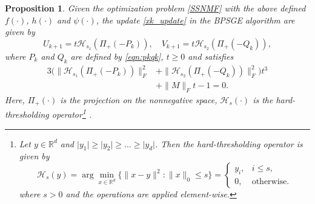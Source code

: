 \documentclass[letterpaper]{article} %
\newtheorem{proposition}{Proposition}
\begin{document}
	\begin{proposition}\label{Prop_SSNMF}
		Given the optimization problem \eqref{SSNMF} with the above defined $f(\cdot)$, $h(\cdot)$ and $\psi(\cdot)$, the update  \eqref{xk_update} in the BPSGE algorithm   are given by
		\[
		U_{k+1}=t\mathcal{H}_{s_{1}}(\Pi_{+}(-P_{k})), \quad V_{k+1}=t\mathcal{H}_{s_{2}}(\Pi_{+}(-Q_{k})),
		\]
		where $P_k$ and $Q_k$ are defined by \eqref{eqn:pkqk}, $t\ge 0$ and satisfies
		\[\begin{aligned}
			3(\|\mathcal{H}_{s_{1}}(\Pi_{+}(-P_{k}))\|_{F}^{2}&+\|\mathcal{H}_{s_{2}}(\Pi_{+}(-Q_{k}))\|_{F}^{2})t^{3} \\&+\|M\|_{F}t-1=0.
		\end{aligned}\]
		Here, $\Pi_{+}(\cdot)$ is the projection on the nonnegative space, $\mathcal{H}_{s}(\cdot)$ is the hard-thresholding operator\footnote{Let $y\in\mathbb{R}^{d}$ and   $\vert y_{1}\vert \ge \vert y_{2}\vert \ge \dots  \ge \vert y_{d}\vert$. Then the hard-thresholding operator  is given by
			\[
			\mathcal{H}_{s}(y)=\arg\min_{x\in\mathbb{R}^{d}} \{\|x-y\|^{2}:\|x\|_{0}\le s\}=\begin{cases}
				y_{i},  & i\le s,\\
				0, & \text{otherwise.}
			\end{cases}
			\]
			where $s > 0$ and the operations are applied element-wise.} \cite{LussT13}.
	\end{proposition}
\end{document}

